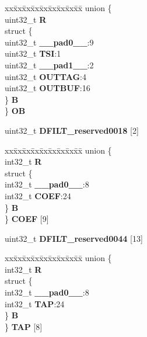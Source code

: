 \begin{DoxyCompactItemize}
\begin{tabbing}
\end{tabbing}\item 
\mbox{\label{structDECFIL__tag_a34287c51704a3b7f3aacd293ac52ff47}} 
\begin{tabbing}
xx\=xx\=xx\=xx\=xx\=xx\=xx\=xx\=xx\=\kill
union \{\\
\>uint32\_t {\bfseries R}\\
\>struct \{\\
\>\>uint32\_t {\bfseries \_\_pad0\_\_}:9\\
\>\>uint32\_t {\bfseries TSI}:1\\
\>\>uint32\_t {\bfseries \_\_pad1\_\_}:2\\
\>\>uint32\_t {\bfseries OUTTAG}:4\\
\>\>uint32\_t {\bfseries OUTBUF}:16\\
\>\} {\bfseries B}\\
\} {\bfseries OB}\\

\end{tabbing}\item 
\mbox{\label{structDECFIL__tag_a0e4163a28647274cdde4d1a0f3c33bf0}} 
uint32\+\_\+t {\bfseries D\+F\+I\+L\+T\+\_\+reserved0018} \mbox{[}2\mbox{]}
\item 
\mbox{\label{structDECFIL__tag_ac32caaf31322703c2ff4d4dfc8fa9acf}} 
\begin{tabbing}
xx\=xx\=xx\=xx\=xx\=xx\=xx\=xx\=xx\=\kill
union \{\\
\>int32\_t {\bfseries R}\\
\>struct \{\\
\>\>int32\_t {\bfseries \_\_pad0\_\_}:8\\
\>\>int32\_t {\bfseries COEF}:24\\
\>\} {\bfseries B}\\
\} {\bfseries COEF} \mbox{[}9\mbox{]}\\

\end{tabbing}\item 
\mbox{\label{structDECFIL__tag_ab050da587e9f50a7ae9b42e89848de8c}} 
uint32\+\_\+t {\bfseries D\+F\+I\+L\+T\+\_\+reserved0044} \mbox{[}13\mbox{]}
\item 
\mbox{\label{structDECFIL__tag_a01f768e16975e8c5163858662887910d}} 
\begin{tabbing}
xx\=xx\=xx\=xx\=xx\=xx\=xx\=xx\=xx\=\kill
union \{\\
\>int32\_t {\bfseries R}\\
\>struct \{\\
\>\>int32\_t {\bfseries \_\_pad0\_\_}:8\\
\>\>int32\_t {\bfseries TAP}:24\\
\>\} {\bfseries B}\\
\} {\bfseries TAP} \mbox{[}8\mbox{]}\\


\end{tabbing}
\end{DoxyCompactItemize}
